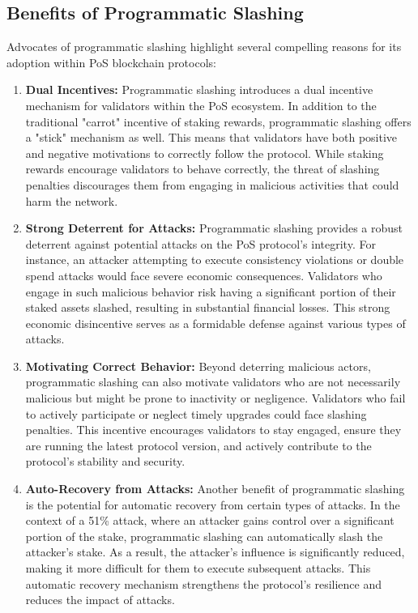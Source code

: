 \subsection{Benefits of Programmatic Slashing}
Advocates of programmatic slashing highlight several compelling reasons for its adoption within PoS blockchain protocols:
\begin{enumerate}
    \item \textbf{Dual Incentives:} Programmatic slashing introduces a dual incentive mechanism for validators within the PoS ecosystem. In addition to the traditional "carrot" incentive of staking rewards, programmatic slashing offers a "stick" mechanism as well. This means that validators have both positive and negative motivations to correctly follow the protocol. While staking rewards encourage validators to behave correctly, the threat of slashing penalties discourages them from engaging in malicious activities that could harm the network.
    \item \textbf{Strong Deterrent for Attacks:} Programmatic slashing provides a robust deterrent against potential attacks on the PoS protocol's integrity. For instance, an attacker attempting to execute consistency violations or double spend attacks would face severe economic consequences. Validators who engage in such malicious behavior risk having a significant portion of their staked assets slashed, resulting in substantial financial losses. This strong economic disincentive serves as a formidable defense against various types of attacks.
    \item \textbf{Motivating Correct Behavior:} Beyond deterring malicious actors, programmatic slashing can also motivate validators who are not necessarily malicious but might be prone to inactivity or negligence. Validators who fail to actively participate or neglect timely upgrades could face slashing penalties. This incentive encourages validators to stay engaged, ensure they are running the latest protocol version, and actively contribute to the protocol's stability and security.
    \item \textbf{Auto-Recovery from Attacks:} Another benefit of programmatic slashing is the potential for automatic recovery from certain types of attacks. In the context of a 51\% attack, where an attacker gains control over a significant portion of the stake, programmatic slashing can automatically slash the attacker's stake. As a result, the attacker's influence is significantly reduced, making it more difficult for them to execute subsequent attacks. This automatic recovery mechanism strengthens the protocol's resilience and reduces the impact of attacks.
\end{enumerate}

